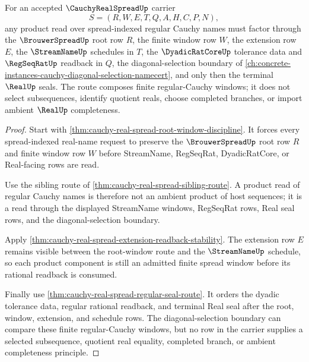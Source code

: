 \begin{theorem}
\label{thm:cauchy-real-spread-diagonal-product-route}
For an accepted $\CauchyRealSpreadUp$ carrier
$$
S=(R,W,E,T,Q,A,H,C,P,N),
$$
any product read over spread-indexed regular Cauchy names must factor through the $\BrouwerSpreadUp$ root row $R$, the finite window row $W$, the extension row $E$, the $\StreamNameUp$ schedules in $T$, the $\DyadicRatCoreUp$ tolerance data and $\RegSeqRatUp$ readback in $Q$, the diagonal-selection boundary of \autoref{ch:concrete-instances-cauchy-diagonal-selection-namecert}, and only then the terminal $\RealUp$ seals. The route composes finite regular-Cauchy windows; it does not select subsequences, identify quotient reals, choose completed branches, or import ambient $\RealUp$ completeness.
\end{theorem}
\begin{proof}
Start with \autoref{thm:cauchy-real-spread-root-window-discipline}. It forces every spread-indexed real-name request to preserve the $\BrouwerSpreadUp$ root row $R$ and finite window row $W$ before StreamName, RegSeqRat, DyadicRatCore, or Real-facing rows are read.

Use the sibling route of \autoref{thm:cauchy-real-spread-sibling-route}. A product read of regular Cauchy names is therefore not an ambient product of host sequences; it is a read through the displayed StreamName windows, RegSeqRat rows, Real seal rows, and the diagonal-selection boundary.

Apply \autoref{thm:cauchy-real-spread-extension-readback-stability}. The extension row $E$ remains visible between the root-window route and the $\StreamNameUp$ schedule, so each product component is still an admitted finite spread window before its rational readback is consumed.

Finally use \autoref{thm:cauchy-real-spread-regular-seal-route}. It orders the dyadic tolerance data, regular rational readback, and terminal Real seal after the root, window, extension, and schedule rows. The diagonal-selection boundary can compare these finite regular-Cauchy windows, but no row in the carrier supplies a selected subsequence, quotient real equality, completed branch, or ambient completeness principle.
\end{proof}


